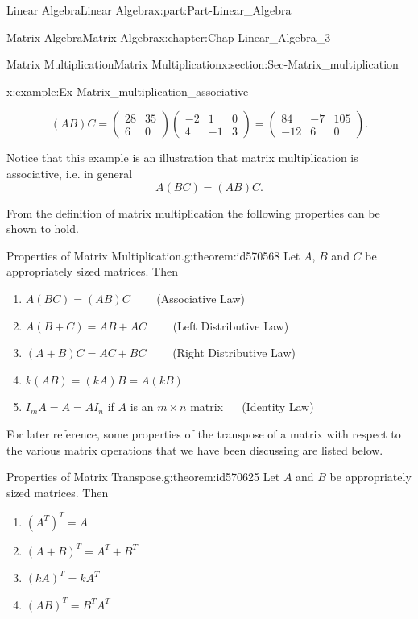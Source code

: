 \documentclass[oneside,10pt,]{book}
\numberwithin{equation}{section}
\newcommand{\amp}{&}
\begin{document}
\begin{partptx}{Linear Algebra}{}{Linear Algebra}{}{}{x:part:Part-Linear_Algebra}
\begin{chapterptx}{Matrix Algebra}{}{Matrix Algebra}{}{}{x:chapter:Chap-Linear_Algebra_3}
\begin{sectionptx}{Matrix Multiplication}{}{Matrix Multiplication}{}{}{x:section:Sec-Matrix_multiplication}
\begin{example}{}{x:example:Ex-Matrix_multiplication_associative}
\begin{enumerate}[label=\alph*]
\begin{equation*}
(AB)C = \begin{pmatrix} 28 \amp 35 \\ 6 \amp 0\end{pmatrix} \begin{pmatrix}-2 \amp 1 \amp 0 \\ 4 \amp -1 \amp 3\end{pmatrix} = \begin{pmatrix}84 \amp -7 \amp 105 \\ -12 \amp 6 \amp 0\end{pmatrix}.
\end{equation*}
%
\end{enumerate}
Notice that this example is an illustration that matrix multiplication is associative, i.e. in general%
\begin{equation*}
A(BC) = (AB)C\text{.}
\end{equation*}
%
\end{example}
From the definition of matrix multiplication the following properties can be shown to hold.%
\begin{theorem}{Properties of Matrix Multiplication.}{}{g:theorem:id570568}%
Let \(A\), \(B\) and \(C\) be appropriately sized matrices. Then%
\begin{enumerate}[label=(\arabic*)]
\item{}\(A(BC)=(AB)C \qquad\) (Associative Law)%
\item{}\(A(B+C) = AB + AC \qquad\) (Left Distributive Law)%
\item{}\((A+B)C = AC + BC \qquad\) (Right Distributive Law)%
\item{}\(\displaystyle k(AB) = (kA)B = A(kB)\)%
\item{}\(I_mA = A = AI_n\) if \(A\) is an \(m \times n\) matrix \(\quad\) (Identity Law)%
\end{enumerate}
%
\end{theorem}
For later reference, some properties of the transpose of a matrix with respect to the various matrix operations that we have been discussing are listed below.%
\begin{theorem}{Properties of Matrix Transpose.}{}{g:theorem:id570625}%
Let \(A\) and \(B\) be appropriately sized matrices. Then%
\begin{enumerate}[label=(\arabic*)]
\item{}\(\displaystyle (A^T)^T = A\)%
\item{}\(\displaystyle (A+B)^T = A^T + B^T \)%
\item{}\(\displaystyle (kA)^T = k A^T \)%
\item{}\(\displaystyle (AB)^T = B^TA^T \)%

\end{enumerate}
\end{theorem}
\end{sectionptx}
\end{chapterptx}
\end{partptx}
\end{document}

